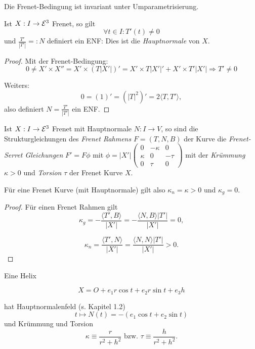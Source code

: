 \begin{remark}
	Die Frenet-Bedingung ist invariant unter Umparametrisierung.
\end{remark}

\begin{lemma, definition}
	Ist $X: I \rightarrow \mathcal E^3$ Frenet, so gilt \[ \forall t \in I : T'(t) \not = 0 \] und $\frac{T'}{|T'|} =: N$ definiert ein ENF: Dies ist die \emph{Hauptnormale} von $X$.
\end{lemma, definition}

\begin{proof}
	Mit der Frenet-Bedingung:
	\[0 \not = X' \times X''= X' \times (T|X'|)' = X' \times T|X'|' + X'\times T'|X'| \Rightarrow T' \not = 0 \]
	
	Weiters: \[ 0 = (1)' = (|T|^2)' = 2\langle T,T' \rangle, \]
	also definiert $N = \frac{T'}{|T'|}$ ein ENF.
\end{proof}

\begin{lemma, definition}
	Ist $X: I \rightarrow \mathcal E^3$ Frenet mit Hauptnormale $N: I \rightarrow V$, so sind die Strukturgleichungen des \emph{Frenet Rahmens} $F = (T,N,B)$ der Kurve die \emph{Frenet-Serret Gleichungen} $F' = F\phi$ mit $\phi = |X'|\begin{pmatrix}
	0 & - \kappa & 0\\
	\kappa & 0 & - \tau \\
	0 & \tau & 0
	\end{pmatrix}$
	 mit der \emph{Krümmung} $\kappa > 0$ und \emph{Torsion} $\tau$ der Frenet Kurve $X$.
\end{lemma, definition}

\begin{remark}
	Für eine Frenet Kurve (mit Hauptnormale) gilt also $\kappa_n = \kappa > 0$ und $\kappa_g = 0$.
\end{remark}

\begin{proof}
	Für einen Frenet Rahmen gilt 
	\[ \kappa_g = - \frac{\langle T', B \rangle}{|X'|} = - \frac{\langle N, B \rangle |T'|}{|X'|} = 0, \]
	
	\[ \kappa_n = \frac{\langle T', N \rangle}{|X'|} = \frac{\langle N, N \rangle |T'|}{|X'|} >0. \]
\end{proof}

\begin{example}
	Eine Helix
	
	\[ X = O + e_1 r \cos t + e_2 r \sin t + e_3 h \]
	
	hat Hauptnormalenfeld (s. Kapitel 1.2) \[ t \mapsto N(t) = - (e_1 \cos t + e_2 \sin t) \] und Krümmung und Torsion 
	\[ \kappa \equiv \frac{r}{r^2 +h^2} \text{ bzw. } \tau \equiv \frac{h}{r^2+h^2} . \]
\end{example}

